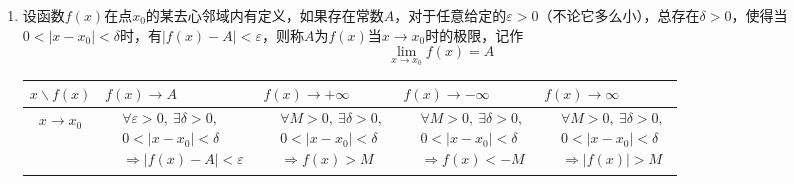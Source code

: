 \documentclass[../book.tex]{subfiles}
\begin{document}
    \begin{enumerate}
        \item 设函数$f(x)$在点$x_0$的某去心邻域内有定义，如果存在常数$A$，对于任意给定的$\varepsilon > 0$（不论它多么小），总存在$\delta > 0$，使得当$0 < |x - x_0| < \delta$时，有$|f(x) - A| < \varepsilon$，则称$A$为$f(x)$当$x \to x_0$时的极限，记作
        \[
            \lim\limits_{x \to x_0} f(x) = A
        \]

        \renewcommand{\arraystretch}{1.6}
        \setlength{\tabcolsep}{6pt}

        \begin{tabular}{|c|p{3.2cm}|p{3.2cm}|p{3.2cm}|p{3.2cm}|}
            \hline
            $x \backslash f(x)$
            & $f(x)\to A$
            & $f(x)\to +\infty$
            & $f(x)\to -\infty$
            & $f(x)\to \infty$
            \\ \hline

            $x\to x_0$
            & $\begin{aligned}
                   &\forall\varepsilon>0,\ \exists\delta>0,\\
                   &0<|x-x_0|<\delta\\
                   &\Rightarrow |f(x)-A|<\varepsilon
            \end{aligned}$
            & $\begin{aligned}
                   &\forall M>0,\ \exists\delta>0,\\
                   &0<|x-x_0|<\delta\\
                   &\Rightarrow f(x)>M
            \end{aligned}$
            & $\begin{aligned}
                   &\forall M>0,\ \exists\delta>0,\\
                   &0<|x-x_0|<\delta\\
                   &\Rightarrow f(x)<-M
            \end{aligned}$
            & $\begin{aligned}
                   &\forall M>0,\ \exists\delta>0,\\
                   &0<|x-x_0|<\delta\\
                   &\Rightarrow |f(x)|>M
            \end{aligned}$
            \\ \hline


\end{tabular}
\end{enumerate}
\end{document}
